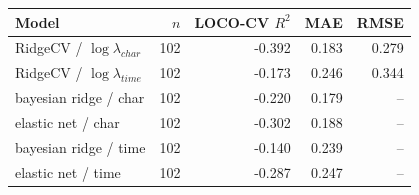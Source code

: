 \begin{tabular}{lrrrr}\toprule Model & $n$ & LOCO-CV $R^2$ & MAE & RMSE\\ \midrule
RidgeCV / $\log\lambda_{char}$ & 102 & -0.392 & 0.183 & 0.279\\
RidgeCV / $\log\lambda_{time}$ & 102 & -0.173 & 0.246 & 0.344\\
bayesian ridge / char & 102 & -0.220 & 0.179 & --\\
elastic net / char & 102 & -0.302 & 0.188 & --\\
bayesian ridge / time & 102 & -0.140 & 0.239 & --\\
elastic net / time & 102 & -0.287 & 0.247 & --\\
\bottomrule\end{tabular}
